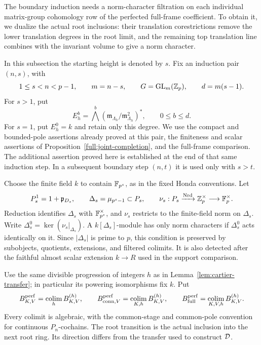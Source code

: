 The boundary induction needs a norm-character filtration on
each individual matrix-group cohomology row of the perfected
full-frame coefficient. To obtain it, we dualize the actual root
inclusions: their translation corestrictions remove the lower
translation degrees in the root limit, and the remaining top
translation line combines with the invariant volume to give
a norm character.

In this subsection the starting height is denoted by $s$.
Fix an induction pair $(n,s)$, with
\[
 1\leq s<n<p-1,\qquad m=n-s,\qquad
 G=\operatorname{GL}_m(\mathbb Z_p),\qquad d=m(s-1).
\]
For $s>1$, put
\[
 E_h^b=\bigwedge^b
       (\mathfrak m_{\Lambda_h}/\mathfrak m_{\Lambda_h}^2)^*,
       \qquad 0\leq b\leq d.
\]
For $s=1$, put $E_h^0=k$ and retain only this degree.
We use the compact and bounded-pole assertions already proved at this
pair, the finiteness and scalar assertions of
Proposition~\ref{full:joint-completion}, and the full-frame comparison.
The additional assertion proved here is established at the end of that
same induction step.  In a subsequent boundary step $(n,t)$ it is used
only with $s>t$.

Choose the finite field $k$ to contain $\mathbb F_{p^s}$, as in the fixed Honda
conventions.  Let
\[
 P_s^1=1+\mathfrak p_{D_s},\qquad
 \Delta_s=\mu_{p^s-1}\subset P_s,\qquad
 \nu_s:P_s\xrightarrow{\operatorname{Nrd}}\mathbb Z_p^\times
                         \longrightarrow\mathbb F_p^\times.
\]
Reduction identifies $\Delta_s$ with $\mathbb F_{p^s}^{\times}$, and
$\nu_s$ restricts to the finite-field norm on $\Delta_s$.
Write $\Delta_s^0=\ker(\nu_s|_{\Delta_s})$.
A $k[\Delta_s]$-module has only norm characters if
$\Delta_s^0$ acts identically on it.  Since
$|\Delta_s|$ is prime to $p$, this condition is preserved by
subobjects, quotients, extensions, and filtered colimits.
It is also detected after the faithful almost scalar extension
$k\to R$ used in the support comparison.

Use the same divisible progression of integers $h$ as in
Lemma~\ref{lem:cartier-transfer}; in particular its powering
isomorphisms fix $k$.  Put
\[
 B_{K,V}^{\mathrm{perf}}=\operatorname*{colim}_h B_{K,V}^{(h)},\qquad
 B_{\mathrm{conn},V}^{\mathrm{perf}}
     =\operatorname*{colim}_{K,h}B_{K,V}^{(h)},\qquad
 B_{\mathrm{full}}^{\mathrm{perf}}
     =\operatorname*{colim}_{K,V,h}B_{K,V}^{(h)} .
\]
Every colimit is algebraic, with the common-stage and common-pole
convention for continuous $P_n$-cochains.  The root transition is the
actual inclusion into the next root ring.  Its direction differs from
the transfer used to construct $\mathcal D$.

